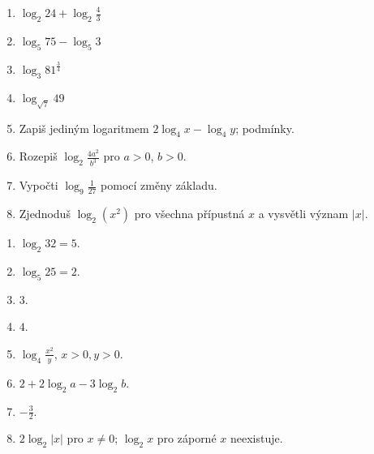 \documentclass[11pt,a4paper]{article}
\begin{document}
\begin{zadaniReseniBox}[title={Domácí úkol}]
\begin{enumerate}[label=\alph*)]
\item $\log_2 24+\log_2\frac43$
\item $\log_5 75-\log_5 3$
\item $\log_3 81^{\frac34}$
\item $\log_{\sqrt7}49$
\item Zapiš jediným logaritmem $2\log_4 x-\log_4 y$; podmínky.
\item Rozepiš $\log_2\frac{4a^2}{b^3}$ pro $a>0$, $b>0$.
\item Vypočti $\log_9\frac1{27}$ pomocí změny základu.
\item Zjednoduš $\log_2(x^2)$ pro všechna přípustná $x$ a vysvětli význam $|x|$.
\end{enumerate}
\tcblower
\begin{enumerate}[label=\alph*)]
\item $\log_2 32=5$.
\item $\log_5 25=2$.
\item $3$.
\item $4$.
\item $\log_4\frac{x^2}{y}$, $x>0,y>0$.
\item $2+2\log_2 a-3\log_2 b$.
\item $-\frac32$.
\item $2\log_2|x|$ pro $x\ne0$; $\log_2 x$ pro záporné $x$ neexistuje.
\end{enumerate}
\end{zadaniReseniBox}
\end{document}
